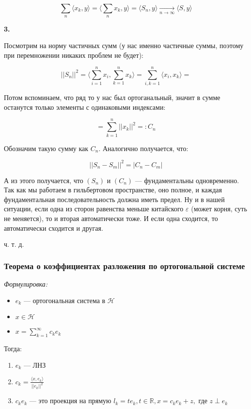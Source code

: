 \documentclass{article}
\def\goesto#1{\underset{#1}{\longrightarrow}}
\def\toinf#1{\goesto{#1 \rightarrow \infty}}
\def\ntoinf{\toinf{n}}
\def\sk#1#2{\langle #1, #2 \rangle}
\begin{document}
\[\sum_n \sk{x_k}{y} = \sk{\sum_n x_k}{y} = \sk{S_n}{y} \ntoinf \sk{S}{y}\]

\textbf{3.}

Посмотрим на норму частичных сумм (у нас именно частичные суммы, поэтому при перемножении никаких проблем не будет):

\[||S_n||^2 = \sk{\sum_{i = 1}^n x_i}{\sum_{k = 1}^n x_k} = \sum_{i, k = 1}^n \sk{x_i}{x_k} =\]

Потом вспоминаем, что ряд то у нас был ортоганальный, значит в сумме останутся только элементы с одинаковыми индексами:

\[=\sum_{k = 1}^{n} ||x_k||^2 =: C_n\]

Обозначим такую сумму как $C_n$. Аналогично получается, что:

\[||S_n - S_m||^2 = |C_n - C_m|\]

А из этого получается, что $(S_n)$ и $(C_n)$ --- фундаментальны одновременно. Так как мы работаем в гильбертовом пространстве, оно полное, и каждая фундаментальная последовательность должна иметь предел. Ну и в нашей ситуации, если одна из сторон равенства меньше китайского $\varepsilon$ (может корня, суть не меняется), то и вторая автоматически тоже. И если одна сходится, то автоматически сходится и другая.

ч. т. д. 

\subsubsection{Теорема о коэффициентах разложения по ортогональной системе}
\textit{Формулировка:}

\begin{itemize}
    \item ${e_k}$ --- ортогональная система в $\mathcal{H}$
    \item $x \in \mathcal{H}$
    \item $x = \sum_{k = 1}^{\infty} c_k e_k$
\end{itemize}

Тогда:

\begin{enumerate}
    \item ${e_k}$ --- ЛНЗ
    \item $c_k = \frac{\langle x, e_k \rangle}{||e_k||^2}$
    \item $c_ke_k$ --- это проекция на прямую $l_k = {te_k, t \in \mathbb{R}}, x = c_ke_k + z, $ где $z \perp e_k$
\end{enumerate}
\end{document}
